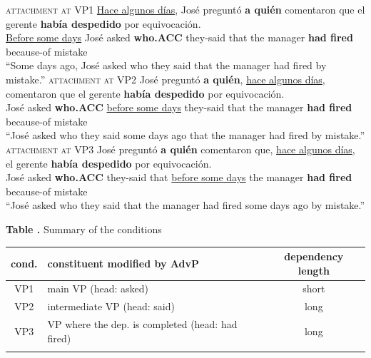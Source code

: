 \documentclass{frontiersSCNS}\usepackage{knitr}
\begin{document}
\begin{exe} 
\ex \label{items}

\begin{xlist}
\ex \textsc{attachment at VP1}
\gll  \underline{Hace algunos días}, José preguntó {\textbf{a quién}} comentaron que el gerente \textbf{había despedido} por equivocación.  \label{et:V1}\\ 
\underline{Before some days} José asked \textbf{who.ACC}  they-said that the manager \textbf{had fired} because-of mistake\\
\glt  ``Some days ago, José asked who they said that the manager had fired by mistake.''
\ex \textsc{attachment at VP2}
\gll  José preguntó {\textbf{a quién}}, \underline{hace algunos días}, comentaron que el gerente \textbf{había despedido} por equivocación.   \label{et:V2}\\ 
José asked \textbf{who.ACC} \underline{before some days} they-said that the manager \textbf{had fired} because-of mistake\\
\glt  ``José asked who they said  some days ago that the manager had fired by mistake.''
\ex \textsc{attachment at VP3}
\gll  José preguntó {\textbf{a quién}} comentaron que, \underline{hace algunos días}, el gerente \textbf{había despedido} por equivocación. \label{et:V3}\\ 
José asked \textbf{who.ACC}  they-said that \underline{before some days} the manager \textbf{had fired} because-of mistake\\
\glt   ``José asked who they said that the manager had fired some days ago by mistake.''
\end{xlist} 
\end{exe}


\begin{table}[h]
\textbf{\label{tab:sum-conditions} Table .}{ Summary of the conditions }

\processtable{ }
{\begin{tabular}{clc}
\toprule
cond. & constituent modified by AdvP
 & dependency length \\
\midrule
VP1 & main VP (head: asked) & short  \\ 
VP2 & intermediate VP (head: said) & long   \\ 
VP3 & VP where the dep. is completed (head: had fired) & long \\ 
\botrule
\end{tabular}}{}
\end{table}
\end{document}
